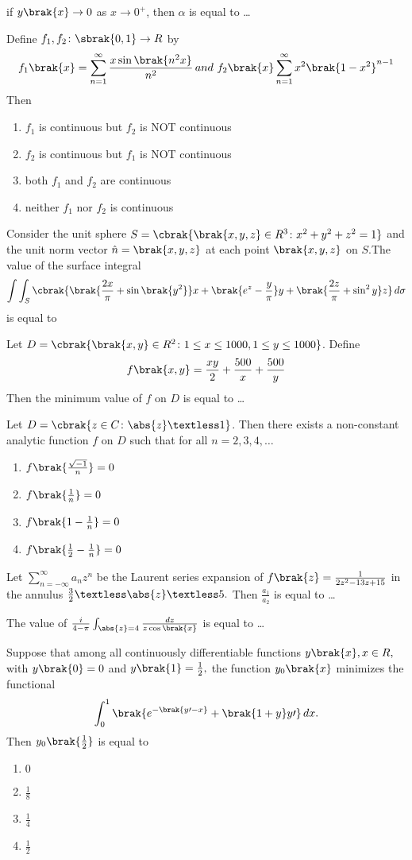         if $y\brak{x}\to 0$ as $x\to 0^{+}$, then $\alpha$ is equal to \dots
    \item Define $f_1,f_2\colon\sbrak{0,1}\to R$ by
        $$f_1\brak{x}=\sum_{n=1}^{\infty}\frac{x\sin\brak{n^2x}}{n^2}\,and\,\,f_2\brak{x}\sum_{n=1}^{\infty}x^2\brak{1-x^2}^{n-1}$$
        Then
        \begin{enumerate}
            \item $f_1$ is continuous but $f_2$ is NOT continuous 
            \item $f_2$ is continuous but $f_1$ is NOT continuous 
            \item both $f_1$ and $f_2$ are continuous
            \item neither $f_1$ nor $f_2$ is continuous
        \end{enumerate}
    \item Consider the unit sphere $S=\cbrak{\brak{x,y,z}\in R^3\colon x^2+y^2+z^2=1}$ and the unit norm vector $\hat{n}=\brak{x,y,z}$ at each point $\brak{x,y,z}$ on $S$.The value of the surface integral 
        $$\int\int_{S}\cbrak{\brak{\frac{2x}{\pi}+\sin\brak{y^2}}x+\brak{e^z-\frac{y}{\pi}}y+\brak{\frac{2z}{\pi}+\sin^2y}z}\,d\sigma$$
        is equal to
    \item Let $D=\cbrak{\brak{x,y}\in R^2\colon 1\leq x\leq1000,1\leq y\leq1000}$. Define
        $$f\brak{x,y}=\frac{xy}{2}+\frac{500}{x}+\frac{500}{y}$$
        Then the minimum value of $f$ on $D$ is equal to \dots
    \item Let $D=\cbrak{z\in C\colon \abs{z}\textless 1}$. Then there exists a non-constant analytic function $f$ on $D$ such that for all $n=2,3,4,\dots$ 
    \begin{enumerate}
        \item $f\brak{\frac{\sqrt{-1}}{n}}=0$
        \item $f\brak{\frac{1}{n}}=0$
        \item $f\brak{1-\frac{1}{n}}=0$
        \item $f\brak{\frac{1}{2}-\frac{1}{n}}=0$
    \end{enumerate}
    \item Let $\sum_{n=-\infty}^{\infty}a_nz^n$ be the Laurent series expansion of $f\brak{z}=\frac{1}{2z^2-13z+15}$ in the annulus $\frac{3}{2}\textless\abs{z}\textless 5.$ Then $\frac{a_1}{a_2}$ is equal to \dots 
    \item The value of $\frac{i}{4-\pi}\int_{\abs{z}=4} \frac{dz}{z\cos\brak{x}}$ is equal to \dots
    \item Suppose that among all continuously differentiable functions $y\brak{x},x\in R,$ with $y\brak{0}=0$ and $y\brak{1}=\frac{1}{2},$ the function $y_0\brak{x}$ minimizes the functional 
        $$\int_{0}^{1}\brak{e^{-\brak{y\prime-x}}+\brak{1+y}y\prime}\,dx.$$
        Then $y_0\brak{\frac{1}{2}}$ is equal to 
            \begin{enumerate}
                \item $0$
                \item $\frac{1}{8}$
                \item $\frac{1}{4}$
                \item $\frac{1}{2}$
            \end{enumerate}
